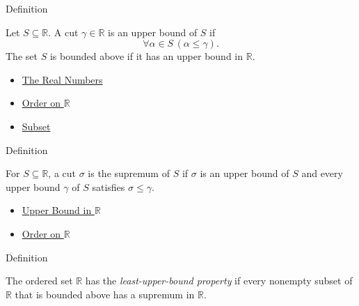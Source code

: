 \begin{definitionbox}{Definition}
\begin{definition}
\label{def:upper-bound-in-r}
Let $S\subseteq\mathbb{R}$. A cut $\gamma\in\mathbb{R}$ is an upper bound of $S$
if
\[
\forall\alpha\in S\,(\alpha\le\gamma).
\]
The set $S$ is bounded above if it has an upper bound in $\mathbb{R}$.
\end{definition}
\end{definitionbox}

\begin{dependencies}
\begin{itemize}
  \item \hyperref[def:reals]{The Real Numbers}
  \item \hyperref[def:order-on-r]{Order on $\mathbb{R}$}
  \item \hyperref[def:subset]{Subset}
\end{itemize}
\end{dependencies}

\begin{definitionbox}{Definition}
\begin{definition}
\label{def:supremum-in-r}
For $S\subseteq\mathbb{R}$, a cut $\sigma$ is the supremum of $S$ if $\sigma$
is an upper bound of $S$ and every upper bound $\gamma$ of $S$ satisfies
$\sigma\le\gamma$.
\end{definition}
\end{definitionbox}

\begin{dependencies}
\begin{itemize}
  \item \hyperref[def:upper-bound-in-r]{Upper Bound in $\mathbb{R}$}
  \item \hyperref[def:order-on-r]{Order on $\mathbb{R}$}
\end{itemize}
\end{dependencies}

\begin{definitionbox}{Definition}
\begin{definition}
\label{def:least-upper-bound-property-on-r}
The ordered set $\mathbb{R}$ has the \emph{least-upper-bound property} if every
nonempty subset of $\mathbb{R}$ that is bounded above has a supremum in
$\mathbb{R}$.
\end{definition}
\end{definitionbox}

